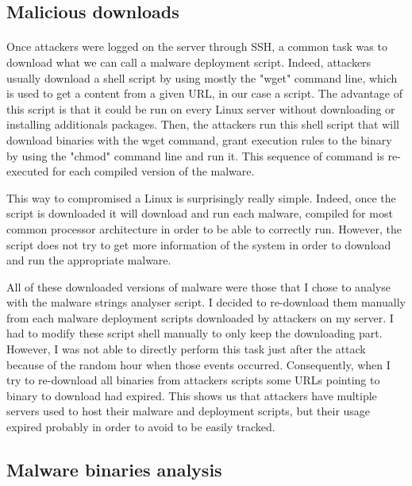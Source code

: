 \subsection{Malicious downloads}

\paragraph{} %

Once attackers were logged on the server through SSH, a common task was to download what we
can call a malware deployment script. Indeed, attackers usually download a shell script by
using mostly the "wget" command line, which is used to get a content from a given URL, in our
case a script. The advantage of this script is that it could be run on every Linux server 
without downloading or installing additionals packages.
Then, the attackers run this shell script that will download binaries with the wget command,
grant execution rules to the binary by using the "chmod" command line and run it. This sequence
of command is re-executed for each compiled version of the malware.

This way to compromised a Linux is surprisingly really simple. Indeed, once the script is 
downloaded it will download and run each malware, compiled for most common processor architecture
in order to be able to correctly run. However, the script does not try to get more information
of the system in order to download and run the appropriate malware.

All of these downloaded versions of malware were those that I chose to analyse with the 
malware strings analyser script. I decided to re-download them manually from each 
malware deployment scripts downloaded by attackers on my server. I had to modify these
script shell manually to only keep the downloading part. However, I was not able to 
directly perform this task just after the attack because of the random hour when those events
occurred. Consequently, when I try to re-download all binaries from attackers scripts some URLs
pointing to binary to download had expired.
This shows us that attackers have multiple servers used to host their malware and deployment
scripts, but their usage expired probably in order to avoid to be easily tracked.

\subsection{Malware binaries analysis}

